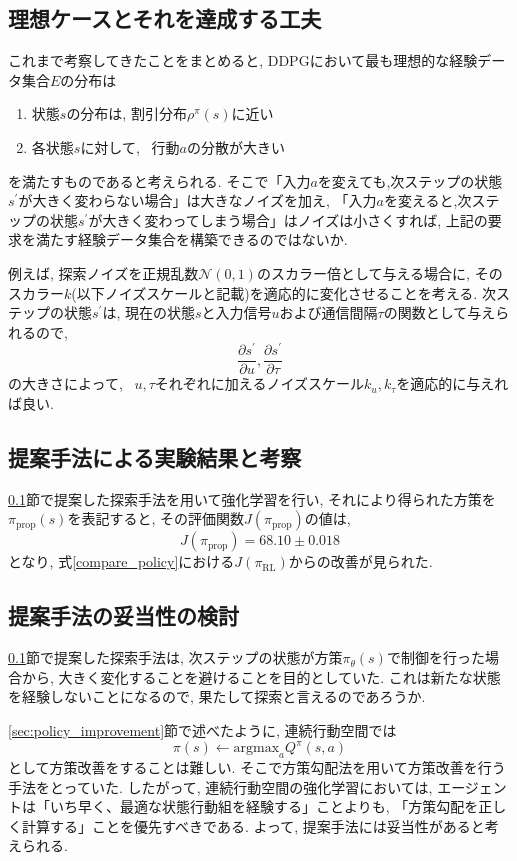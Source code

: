 \documentclass[dvipdfmx]{ampmt}
\newcommand{\pdif}[2]{\frac{\partial#1}{\partial#2}}
\begin{document}
\subsection{理想ケースとそれを達成する工夫}
\label{sec:proposed_method}
これまで考察してきたことをまとめると, DDPGにおいて最も理想的な経験データ集合$E$の分布は
\begin{enumerate} 
	\item 状態$s$の分布は, 割引分布$\rho^{\pi}(s)$に近い
	\item 各状態$s$に対して, ~行動$a$の分散が大きい
\end{enumerate}
を満たすものであると考えられる.%
そこで「入力$a$を変えても,次ステップの状態$s^{\prime}$が大きく変わらない場合」は大きなノイズを加え, 「入力$a$を変えると,次ステップの状態$s^{\prime}$が大きく変わってしまう場合」はノイズは小さくすれば, 上記の要求を満たす経験データ集合を構築できるのではないか.\par
例えば, 探索ノイズを正規乱数$\mathcal{N}(0,1)$のスカラー倍として与える場合に, そのスカラー$k$(以下ノイズスケールと記載)を適応的に変化させることを考える. 次ステップの状態$s^{\prime}$は, 現在の状態$s$と入力信号$u$および通信間隔$\tau$の関数として与えられるので, 
\[\pdif{s^{\prime}}{u}, \pdif{s^{\prime}}{\tau}\]
の大きさによって, ~$u,\tau$それぞれに加えるノイズスケール$k_u, k_{\tau}$を適応的に与えれば良い. \par

\subsection{提案手法による実験結果と考察}
\ref{sec:proposed_method}節で提案した探索手法を用いて強化学習を行い, それにより得られた方策を$\pi_{\textrm{prop}}(s)$を表記すると, その評価関数$J(\pi_{\textrm{prop}})$の値は, 
\begin{equation}
	J(\pi_{\textrm{prop}}) = 68.10 \pm 0.018
\end{equation}
となり, 式\eqref{compare_policy}における$J(\pi_{\textrm{RL}})$からの改善が見られた.


\subsection{提案手法の妥当性の検討}
\ref{sec:proposed_method}節で提案した探索手法は, 次ステップの状態が方策$\pi_{\theta}(s)$で制御を行った場合から, 大きく変化することを避けることを目的としていた. これは新たな状態を経験しないことになるので, 果たして探索と言えるのであろうか.\par
\ref{sec:policy_improvement}節で述べたように, 連続行動空間では
\begin{equation}
	\pi(s) \gets \textrm{argmax}_{a} Q^{\pi}(s,a)
\end{equation}
として方策改善をすることは難しい. そこで方策勾配法を用いて方策改善を行う手法をとっていた. したがって, 連続行動空間の強化学習においては, エージェントは「いち早く、最適な状態行動組を経験する」ことよりも, 「方策勾配を正しく計算する」ことを優先すべきである. よって, 提案手法には妥当性があると考えられる.
\end{document}
